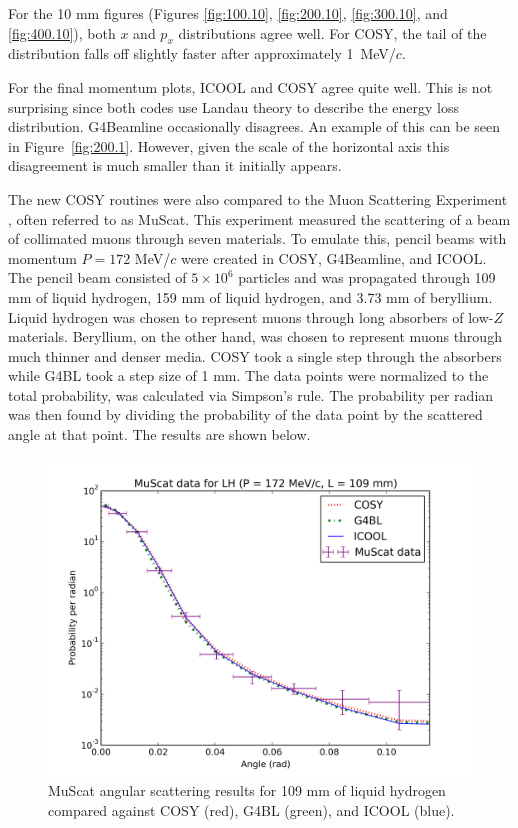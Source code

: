 For the 10 mm figures (Figures \ref{fig:100.10}, \ref{fig:200.10}, \ref{fig:300.10}, and \ref{fig:400.10}), both $x$ and $p_x$ distributions agree well. For COSY, the tail of the distribution falls off slightly faster after approximately 1~MeV/$c$. 

For the final momentum plots, ICOOL and COSY agree quite well. This is not surprising since both codes use Landau theory to describe the energy loss distribution. G4Beamline occasionally disagrees. An example of this can be seen in Figure~\ref{fig:200.1}. However, given the scale of the horizontal axis this disagreement is much smaller than it initially appears.

\label{sec:validation}

The new COSY routines were also compared to the Muon Scattering Experiment \cite{muscat}, often referred to as MuScat. This experiment measured the scattering of a beam of collimated muons through seven materials. To emulate this, pencil beams with momentum $P=172$ MeV/$c$ were created in COSY, G4Beamline, and ICOOL. The pencil beam consisted of $5\times10^6$ particles and was propagated through 109 mm of liquid hydrogen, 159 mm of liquid hydrogen, and 3.73 mm of beryllium. Liquid hydrogen was chosen to represent muons through long absorbers of low-$Z$ materials. Beryllium, on the other hand, was chosen to represent muons through much thinner and denser media. COSY took a single step through the absorbers while G4BL took a step size of 1 mm. The data points were normalized to the total probability, was calculated via Simpson's rule. The probability per radian was then found by dividing the probability of the data point by the scattered angle at that point. The results are shown below.

\begin{figure}[H]
  \centering
    \includegraphics[width=\textwidth]{Figures/172.109.muscat} 
  \caption{MuScat angular scattering results for 109 mm of liquid hydrogen compared against COSY (red), G4BL (green), and ICOOL (blue).}
  \label{fig:172.109.muscat}
\end{figure}

